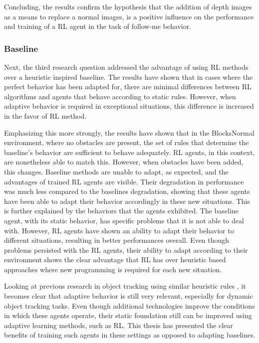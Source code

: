 Concluding, the results confirm the hypothesis that the addition of depth images 
as a means to replace a normal images, is a positive influence on the performance and 
training of a RL agent in the task of follow-me behavior. 

\subsubsection{Baseline}
Next, the third research question addressed the advantage of using RL methods 
over a heuristic inspired baseline. The results have shown that in cases where 
the perfect behavior has been adapted for, there are minimal differences between 
RL algorithms and agents that behave according to static rules. However, when 
adaptive behavior is required in exceptional situations, this difference is increased 
in the favor of RL method. 

Emphasizing this more strongly, the results have shown that in the BlocksNormal environment, 
where no obstacles are present, the set of rules that determine the baseline's behavior 
are sufficient to behave adequately. RL agents, in this context, are nonetheless able to 
match this. However, when obstacles have been added, this changes. Baseline methods 
are unable to adapt, as expected, and the advantages of trained RL agents are visible. 
Their degradation in performance was much less compared to the baselines degradation, showing 
that these agents have been able to adapt their behavior accordingly in these new situations. 
This is further explained by the behaviors that the agents exhibited. 
The baseline agent, with its static behavior, has specific problems that it is 
not able to deal with. However, RL agents have shown an ability to adapt 
their behavior to different situations, resulting in better performances overall. 
Even though problems persisted with the RL agents, their ability to adapt 
according to their environment shows the clear advantage that RL has over 
heuristic based approaches where new programming is required for each new 
situation. 

Looking at previous research in object tracking using similar heuristic rules \cite{DroneFollowUsingPhone, acousticdronefollower, DroneFollowMobileObject, VisualGPS},
it becomes clear that adaptive behavior is still very relevant, especially for 
dynamic object tracking tasks. Even though additional technologies improve 
the conditions in which these agents operate, their static foundation still 
can be improved using adaptive learning methods, such as RL. This thesis has 
presented the clear benefits of training such agents in these settings as opposed 
to adapting baselines. 

